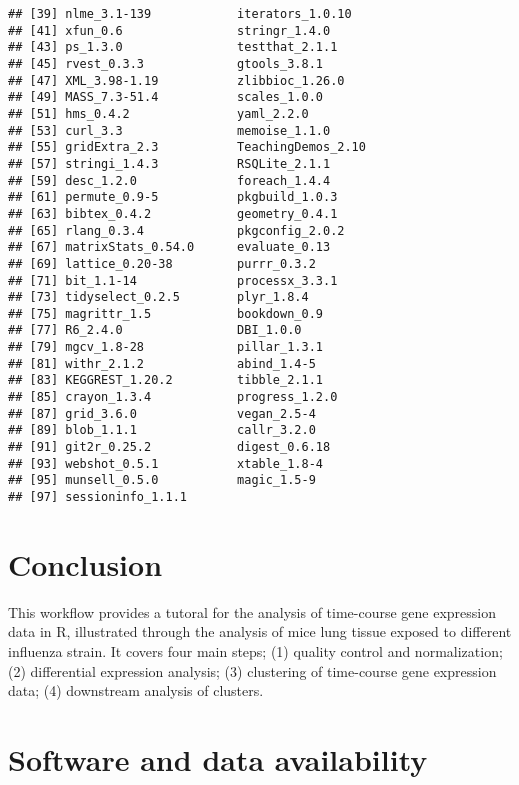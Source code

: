 \documentclass[9pt,a4paper,]{extarticle}
\begin{document}
\begin{verbatim}
## [39] nlme_3.1-139            iterators_1.0.10       
## [41] xfun_0.6                stringr_1.4.0          
## [43] ps_1.3.0                testthat_2.1.1         
## [45] rvest_0.3.3             gtools_3.8.1           
## [47] XML_3.98-1.19           zlibbioc_1.26.0        
## [49] MASS_7.3-51.4           scales_1.0.0           
## [51] hms_0.4.2               yaml_2.2.0             
## [53] curl_3.3                memoise_1.1.0          
## [55] gridExtra_2.3           TeachingDemos_2.10     
## [57] stringi_1.4.3           RSQLite_2.1.1          
## [59] desc_1.2.0              foreach_1.4.4          
## [61] permute_0.9-5           pkgbuild_1.0.3         
## [63] bibtex_0.4.2            geometry_0.4.1         
## [65] rlang_0.3.4             pkgconfig_2.0.2        
## [67] matrixStats_0.54.0      evaluate_0.13          
## [69] lattice_0.20-38         purrr_0.3.2            
## [71] bit_1.1-14              processx_3.3.1         
## [73] tidyselect_0.2.5        plyr_1.8.4             
## [75] magrittr_1.5            bookdown_0.9           
## [77] R6_2.4.0                DBI_1.0.0              
## [79] mgcv_1.8-28             pillar_1.3.1           
## [81] withr_2.1.2             abind_1.4-5            
## [83] KEGGREST_1.20.2         tibble_2.1.1           
## [85] crayon_1.3.4            progress_1.2.0         
## [87] grid_3.6.0              vegan_2.5-4            
## [89] blob_1.1.1              callr_3.2.0            
## [91] git2r_0.25.2            digest_0.6.18          
## [93] webshot_0.5.1           xtable_1.8-4           
## [95] munsell_0.5.0           magic_1.5-9            
## [97] sessioninfo_1.1.1
\end{verbatim}

\hypertarget{conclusion}{%
\section{Conclusion}\label{conclusion}}

This workflow provides a tutoral for the analysis of time-course gene
expression data in R, illustrated through the analysis of mice lung tissue
exposed to different influenza strain. It covers four main steps; (1) quality
control and normalization; (2) differential expression analysis; (3)
clustering of time-course gene expression data; (4) downstream analysis of
clusters.

\hypertarget{software-and-data-availability}{%
\section{Software and data availability}\label{software-and-data-availability}}
\end{document}
